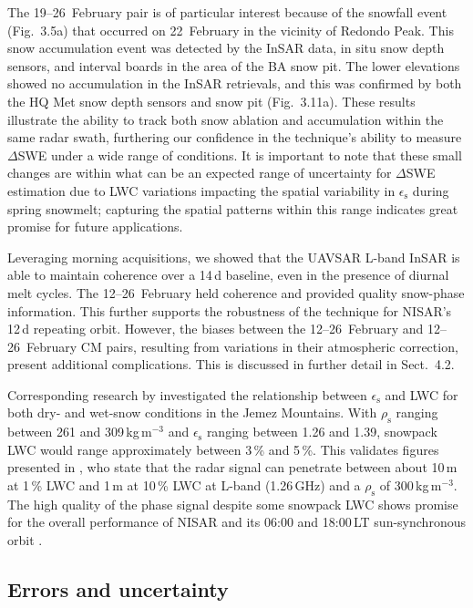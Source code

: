 The 19--26~February pair is of particular interest because of the snowfall event (Fig.~3.5a) that occurred on 22~February in the vicinity of Redondo Peak. This snow accumulation event was detected by the InSAR data, in situ snow depth sensors, and interval boards in the area of the BA snow pit. The lower elevations showed no accumulation in the InSAR retrievals, and this was confirmed by both the HQ Met snow depth sensors and snow pit (Fig.~3.11a). These results illustrate the ability to track both snow ablation and accumulation within the same radar swath, furthering our confidence in the technique's ability to measure $\Delta$SWE under a wide range of conditions. It is important to note that these small changes are within what can be an expected range of uncertainty for $\Delta$SWE estimation due to LWC variations impacting the spatial variability in $\epsilon_\mathrm{s}$ during spring snowmelt; capturing the spatial patterns within this range indicates great promise for future applications.


Leveraging morning acquisitions, we showed that the UAVSAR L-band InSAR is able to maintain coherence over a 14\,d baseline, even in the presence of diurnal melt cycles. The 12--26~February held coherence and provided quality snow-phase information. This further supports the robustness of the technique for NISAR's 12\,d repeating orbit. However, the biases between the 12--26~February and 12--26~February CM pairs, resulting from variations in their atmospheric correction, present additional complications. This is discussed in further detail in Sect.~4.2.

Corresponding research by \citet{webbSituDeterminationDry2021} investigated the relationship between $\epsilon_\mathrm{s}$ and LWC for both dry- and wet-snow conditions in the Jemez Mountains. With $\rho_\mathrm{s}$ ranging between 261 and 309\,kg\,m$^{-3}$ and $\epsilon_\mathrm{s}$ ranging between 1.26 and 1.39, snowpack LWC would range approximately between 3\,\% and 5\,\%. This validates figures presented in \citet{leinssSnowWaterEquivalent2015}, who state that the radar signal can penetrate between about 10\,m at 1\,\% LWC and 1\,m at 10\,\% LWC at L-band (1.26\,GHz) and a $\rho_\mathrm{s}$ of 300\,kg\,m$^{-3}$. The high quality of the phase signal despite some snowpack LWC shows promise for the overall performance of NISAR and its 06:00 and 18:00\,LT sun-synchronous orbit \citep{webbSituDeterminationDry2021,bonnellSpatiotemporalVariationsLiquid2021}.

\hypertarget{ch4-discussion-2}{\subsection{Errors and uncertainty}\label{ch4-discussion-2}}

